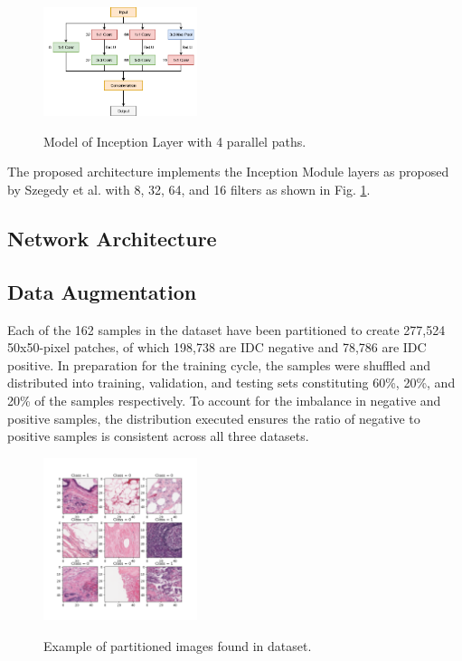 \documentclass[conference]{IEEEtran}
\begin{document}
\begin{figure}
\centering
\includegraphics[width=0.4\textwidth]{figures/Inception_Model.png}
\label{Inception_Model}
\caption{Model of Inception Layer with 4 parallel paths.}
\end{figure}

The proposed architecture implements the Inception Module layers as proposed by Szegedy {et al.} with 8, 32, 64, and 16 filters as shown in Fig. \ref{Inception_Model}. 

\subsection{Network Architecture}
\subsection{Data Augmentation}
Each of the 162 samples in the dataset have been partitioned to create 277,524 50x50-pixel patches, of which 198,738 are IDC negative and 78,786 are IDC positive. In preparation for the training cycle, the samples were shuffled and distributed into training, validation, and testing sets constituting 60\%, 20\%, and 20\% of the samples respectively. To account for the imbalance in negative and positive samples, the distribution executed ensures the ratio of negative to positive samples is consistent across all three datasets.

\begin{figure}
\centering
\includegraphics[width=0.4\textwidth]{figures/dataset_example.png}
\label{dataset_example}
\caption{Example of partitioned images found in dataset.}
\end{figure}
\end{document}
